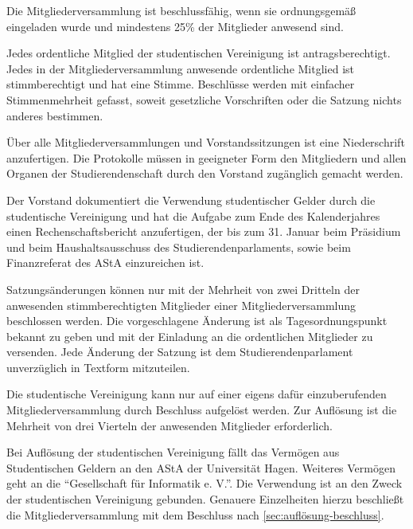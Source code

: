 \begin{contract}
\label{sec:beschlussfassungMitgliederversammlung}

Die Mitgliederversammlung ist beschlussfähig, wenn sie ordnungsgemäß eingeladen wurde und mindestens 25\% der Mitglieder anwesend sind.

Jedes ordentliche Mitglied der studentischen Vereinigung ist antragsberechtigt. Jedes in der Mitgliederversammlung anwesende ordentliche Mitglied ist stimmberechtigt und hat eine Stimme. Beschlüsse werden mit einfacher Stimmenmehrheit gefasst, soweit gesetzliche Vorschriften oder die Satzung nichts anderes bestimmen.



\label{sec:niederschrift}

Über alle Mitgliederversammlungen und Vorstandssitzungen ist eine Niederschrift anzufertigen. Die Protokolle müssen in geeigneter Form den Mitgliedern und allen Organen der Studierendenschaft durch den Vorstand zugänglich gemacht werden.


\label{sec:rechenschaftsbericht}

Der Vorstand dokumentiert die Verwendung studentischer Gelder durch die studentische Vereinigung und hat die Aufgabe zum Ende des Kalenderjahres einen Rechenschaftsbericht anzufertigen, der bis zum 31. Januar beim Präsidium und beim Haushaltsausschuss des Studierendenparlaments, sowie beim Finanzreferat des AStA einzureichen ist.


\label{sec:satzungsänderung}

Satzungsänderungen können nur mit der Mehrheit von zwei Dritteln der anwesenden stimmberechtigten Mitglieder einer Mitgliederversammlung beschlossen werden. Die vorgeschlagene Änderung ist als Tagesordnungspunkt bekannt zu geben und mit der Einladung an die ordentlichen Mitglieder zu versenden. Jede Änderung der Satzung ist dem Studierendenparlament unverzüglich in Textform  mitzuteilen.


\label{sec:auflösung}

Die studentische Vereinigung kann nur auf einer eigens dafür einzuberufenden Mitgliederversammlung durch Beschluss aufgelöst werden. Zur Auflösung ist die Mehrheit von drei Vierteln der anwesenden Mitglieder erforderlich. \label{sec:auflösung-beschluss}

Bei Auflösung der studentischen Vereinigung fällt das Vermögen aus Studentischen Geldern an den AStA der Universität Hagen.  Weiteres Vermögen geht an die ``Gesellschaft für Informatik e. V.''. Die Verwendung ist an den Zweck der studentischen Vereinigung gebunden. Genauere Einzelheiten hierzu beschließt die Mitgliederversammlung mit dem Beschluss nach \ref{sec:auflösung-beschluss}.



\end{contract}
